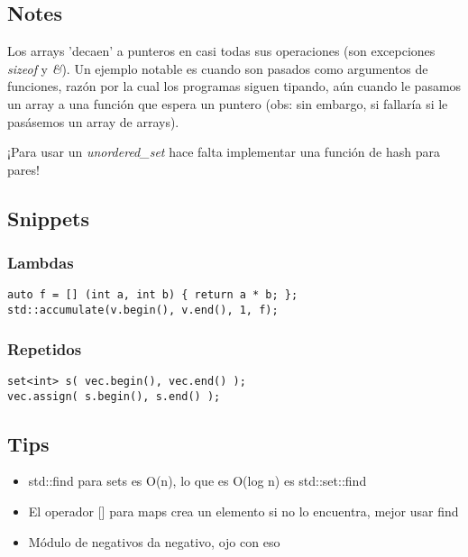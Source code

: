 

\pagebreak


\subsection{Notes}

Los arrays 'decaen' a punteros en casi todas sus operaciones (son excepciones \textit{sizeof} y \textit{\&}). Un ejemplo notable es cuando son pasados como argumentos de funciones, razón por la cual los programas siguen tipando, aún cuando le pasamos un array a una función que espera un puntero (obs: sin embargo, si fallaría si le pasásemos un array de arrays).

¡Para usar un \textit{unordered\_set} hace falta implementar una función de hash para pares!

\subsection{Snippets}

\subsubsection*{Lambdas}
\begin{lstlisting}
auto f = [] (int a, int b) { return a * b; };
std::accumulate(v.begin(), v.end(), 1, f);
\end{lstlisting}

\subsubsection*{Repetidos}
\begin{lstlisting}
set<int> s( vec.begin(), vec.end() );
vec.assign( s.begin(), s.end() );
\end{lstlisting}


\subsection{Tips}
\begin{itemize}
    \item std::find para sets es O(n), lo que es O(log n) es std::set::find
    \item El operador [] para maps crea un elemento si no lo encuentra, mejor usar find
    \item Módulo de negativos da negativo, ojo con eso
\end{itemize}
